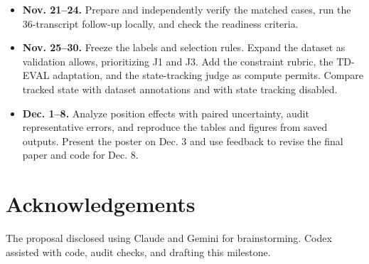 \documentclass[11pt]{article}
\begin{document}
\begin{itemize}
  \item \textbf{Nov. 21--24.} Prepare and independently verify the matched cases, run the 36-transcript follow-up locally, and check the readiness criteria.
  \item \textbf{Nov. 25--30.} Freeze the labels and selection rules. Expand the dataset as validation allows, prioritizing J1 and J3. Add the constraint rubric, the TD-EVAL adaptation, and the state-tracking judge as compute permits. Compare tracked state with dataset annotations and with state tracking disabled.
  \item \textbf{Dec. 1--8.} Analyze position effects with paired uncertainty, audit representative errors, and reproduce the tables and figures from saved outputs. Present the poster on Dec. 3 and use feedback to revise the final paper and code for Dec. 8.
\end{itemize}

\section*{Acknowledgements}
The proposal disclosed using Claude and Gemini for brainstorming. Codex assisted with code, audit checks, and drafting this milestone.

\clearpage

\end{document}
